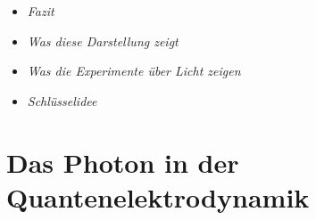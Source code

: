\vspace{1em}
\begin{tcolorbox}[title=Hinweisboxen,hinweisbox]
\begin{itemize}
	\item \emph{Fazit} \dotfill\pageref{box:fazit der photo}
	\item \emph{Was diese Darstellung zeigt} \dotfill\pageref{box:was diese Darstellun}
	\item \emph{Was die Experimente über Licht zeigen} \dotfill\pageref{box:was die Experimente}
\end{itemize}
\end{tcolorbox}

\vspace{1em}
\begin{tcolorbox}[title=hypothetisch Boxen,hypobox]
\begin{itemize}
	\item \emph{Schlüsselidee}\dotfill\pageref{box:schlüsselidee}
\end{itemize}
\end{tcolorbox}




\section{Das Photon in der Quantenelektrodynamik}


